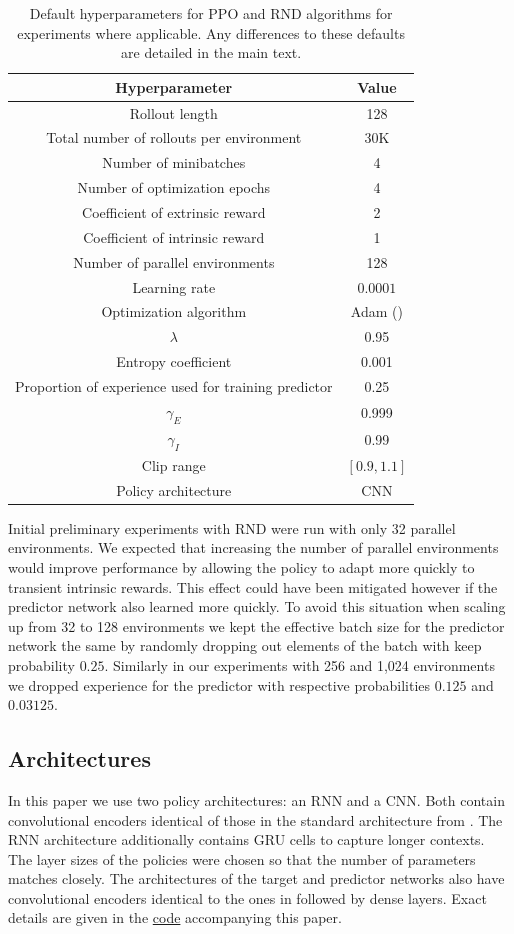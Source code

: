 \documentclass{article} %
\begin{document}
\begin{table}[!ht]
\centering
\begin{tabular}{c | c} 
 Hyperparameter & Value  \\ [0.5ex] 
 \hline
 Rollout length & 128  \\
 Total number of rollouts per environment & 30K  \\
 Number of minibatches & 4  \\
 Number of optimization epochs & 4  \\
 Coefficient of extrinsic reward & 2  \\
 Coefficient of intrinsic reward & 1  \\
 Number of parallel environments & 128  \\
 Learning rate & $0.0001$  \\
 Optimization algorithm & Adam (\citet{kingma2014adam})  \\
 $\lambda$ & 0.95 \\
 Entropy coefficient & 0.001 \\
 Proportion of experience used for training predictor & 0.25 \\
 $\gamma_E$ & 0.999 \\
 $\gamma_I$ & 0.99 \\
 Clip range & $[0.9, 1.1]$ \\
 Policy architecture & CNN \\
\end{tabular}
\caption{Default hyperparameters for PPO and RND algorithms for experiments where applicable. Any differences to these defaults are detailed in the main text.}
\label{table:ppo_rnd_hyperparameters}
\end{table}

Initial preliminary experiments with RND were run with only 32 parallel environments. We expected that increasing the number of parallel environments would improve performance by allowing the policy to adapt more quickly to transient intrinsic rewards. This effect could have been mitigated however if the predictor network also learned more quickly. To avoid this situation when scaling up from 32 to 128 environments we kept the effective batch size for the predictor network the same by randomly dropping out elements of the batch with keep probability $0.25$. Similarly in our experiments with 256 and 1,024 environments we dropped experience for the predictor with respective probabilities $0.125$ and $0.03125$.


\subsection{Architectures}
In this paper we use two policy architectures: an RNN and a CNN. Both contain convolutional encoders identical of those in the standard architecture from \citep{dqn}. The RNN architecture additionally contains GRU \citep{cho2014learning} cells to capture longer contexts. The layer sizes of the policies were chosen so that the number of parameters matches closely. The architectures of the target and predictor networks also have convolutional encoders identical to the ones in \citep{dqn} followed by dense layers. Exact details are given in the \href{https://github.com/openai/random-network-distillation}{code} accompanying this paper.
\end{document}

